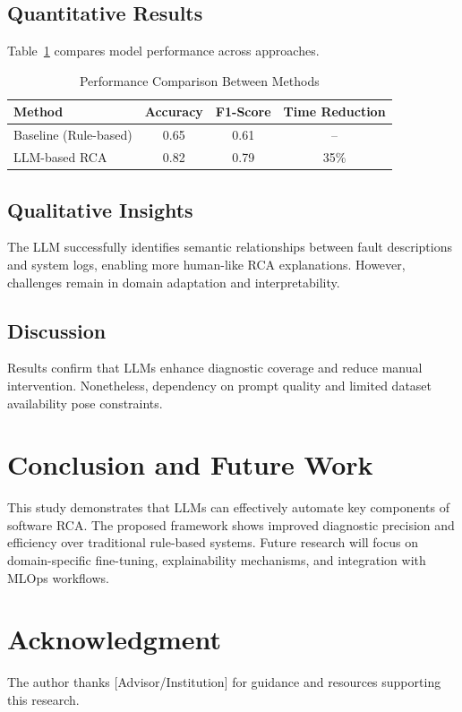 \documentclass[conference]{IEEEtran}
\begin{document}
\subsection{Quantitative Results}
Table~\ref{tab:results} compares model performance across approaches.

\begin{table}[htbp]
\centering
\caption{Performance Comparison Between Methods}
\begin{tabular}{lccc}
\hline
Method & Accuracy & F1-Score & Time Reduction \\
\hline
Baseline (Rule-based) & 0.65 & 0.61 & -- \\
LLM-based RCA & 0.82 & 0.79 & 35\% \\
\hline
\end{tabular}
\label{tab:results}
\end{table}

\subsection{Qualitative Insights}
The LLM successfully identifies semantic relationships between fault descriptions and system logs, enabling more human-like RCA explanations. However, challenges remain in domain adaptation and interpretability.

\subsection{Discussion}
Results confirm that LLMs enhance diagnostic coverage and reduce manual intervention. Nonetheless, dependency on prompt quality and limited dataset availability pose constraints.

\section{Conclusion and Future Work}
This study demonstrates that LLMs can effectively automate key components of software RCA. The proposed framework shows improved diagnostic precision and efficiency over traditional rule-based systems. Future research will focus on domain-specific fine-tuning, explainability mechanisms, and integration with MLOps workflows.

\section*{Acknowledgment}
The author thanks [Advisor/Institution] for guidance and resources supporting this research.



\end{document}
